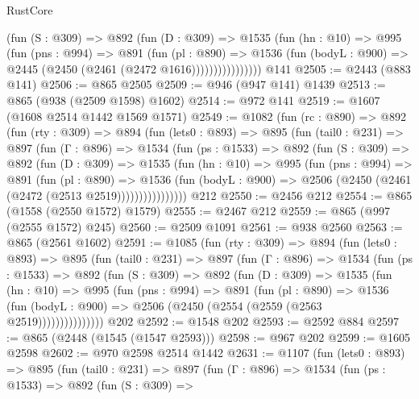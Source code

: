 \begin{lexlean}{RustCore}
\begin{coremodule}
                  (fun (S : @309) =>
                  @892
                    (fun (D : @309) =>
                    @1535
                      (fun (hn : @10) =>
                      @995
                        (fun (pns : @994) =>
                        @891
                          (fun (pl : @890) =>
                          @1536
                            (fun (bodyL : @900) => @2445 (@2450 (@2461 (@2472 @1616))))))))))))))))
    @141
@2505 := @2443 (@883 @141)
@2506 := @865 @2505
@2509 := @946 (@947 @141) @1439
@2513 := @865 (@938 (@2509 @1598) @1602)
@2514 := @972 @141
@2519 := @1607 (@1608 @2514 @1442 @1569 @1571)
@2549 := @1082
    (fun (rc : @890) =>
    @892
      (fun (rty : @309) =>
      @894
        (fun (lets0 : @893) =>
        @895
          (fun (tail0 : @231) =>
          @897
            (fun (Γ : @896) =>
            @1534
              (fun (ps : @1533) =>
              @892
                (fun (S : @309) =>
                @892
                  (fun (D : @309) =>
                  @1535
                    (fun (hn : @10) =>
                    @995
                      (fun (pns : @994) =>
                      @891
                        (fun (pl : @890) =>
                        @1536
                          (fun (bodyL : @900) =>
                          @2506 (@2450 (@2461 (@2472 (@2513 @2519))))))))))))))))
    @212
@2550 := @2456 @212
@2554 := @865 (@1558 (@2550 @1572) @1579)
@2555 := @2467 @212
@2559 := @865 (@997 (@2555 @1572) @245)
@2560 := @2509 @1091
@2561 := @938 @2560
@2563 := @865 (@2561 @1602)
@2591 := @1085
    (fun (rty : @309) =>
    @894
      (fun (lets0 : @893) =>
      @895
        (fun (tail0 : @231) =>
        @897
          (fun (Γ : @896) =>
          @1534
            (fun (ps : @1533) =>
            @892
              (fun (S : @309) =>
              @892
                (fun (D : @309) =>
                @1535
                  (fun (hn : @10) =>
                  @995
                    (fun (pns : @994) =>
                    @891
                      (fun (pl : @890) =>
                      @1536
                        (fun (bodyL : @900) =>
                        @2506 (@2450 (@2554 (@2559 (@2563 @2519)))))))))))))))
    @202
@2592 := @1548 @202
@2593 := @2592 @884
@2597 := @865 (@2448 (@1545 (@1547 @2593)))
@2598 := @967 @202
@2599 := @1605 @2598
@2602 := @970 @2598 @2514 @1442
@2631 := @1107
    (fun (lets0 : @893) =>
    @895
      (fun (tail0 : @231) =>
      @897
        (fun (Γ : @896) =>
        @1534
          (fun (ps : @1533) =>
          @892
            (fun (S : @309) =>

\end{coremodule}
\end{lexlean}
